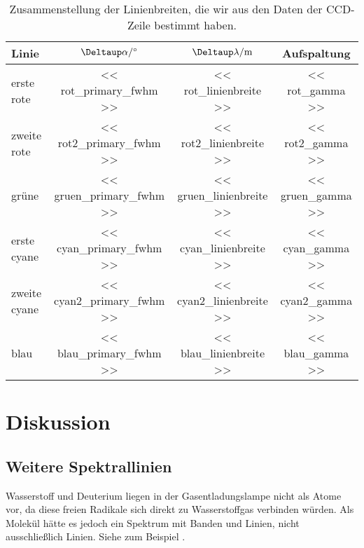 \begin{landscape}

\begin{table}[htbp]
    \centering
    \begin{tabular}{lSSS}
        Linie & {$\Deltaup\alpha / \si\degree$} & {$\Deltaup\lambda /
    \si\meter$} & {Aufspaltung} \\
        \midrule
        erste rote & << rot_primary_fwhm >> & << rot_linienbreite >> & <<
        rot_gamma >> \\
        zweite rote & << rot2_primary_fwhm >> & << rot2_linienbreite >> & <<
        rot2_gamma >> \\
        grüne & << gruen_primary_fwhm >> & << gruen_linienbreite >> & <<
        gruen_gamma >> \\
        erste cyane & << cyan_primary_fwhm >> & << cyan_linienbreite >> & <<
        cyan_gamma >> \\
        zweite cyane & << cyan2_primary_fwhm >> & << cyan2_linienbreite >> & <<
        cyan2_gamma >> \\
        blau & << blau_primary_fwhm >> & << blau_linienbreite >> & <<
        blau_gamma >> \\
    \end{tabular}
    \caption{%
        Zusammenstellung der Linienbreiten, die wir aus den Daten der CCD-Zeile
        bestimmt haben.
    }
    \label{tab:linienbreiten}
\end{table}

\end{landscape}


\FloatBarrier
\section{Diskussion}

\subsection{Weitere Spektrallinien}

Wasserstoff und Deuterium liegen in der Gasentladungslampe nicht als Atome vor,
da diese freien Radikale sich direkt zu Wasserstoffgas verbinden würden. Als
Molekül hätte es jedoch ein Spektrum mit Banden und Linien, nicht
ausschließlich Linien. Siehe zum Beispiel
\cite[Abbildung~14.15]{meschede-gerthsen_24}.

